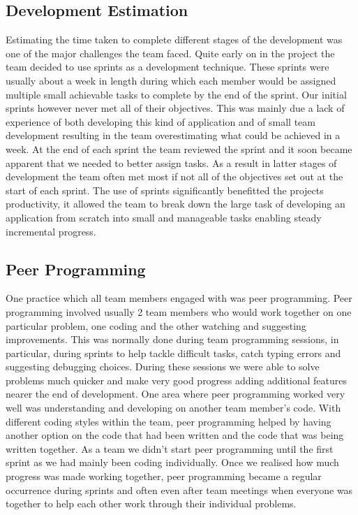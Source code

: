 \documentclass{l3proj}
\begin{document}
\subsection{Development Estimation}
Estimating the time taken to complete different stages of the development was one of the major challenges the team faced. Quite early on in the project the team decided to use sprints as a development technique. These sprints were usually about a week in length during which each member would be assigned multiple small achievable tasks to complete by the end of the sprint. Our initial sprints however never met all of  their objectives. This was mainly due a lack of experience of  both developing this kind of application and of small team development resulting in the team overestimating what could be achieved in a week. At the end of each sprint the team reviewed the sprint and it soon became apparent that we needed to better assign tasks. As a result in latter stages of development the team often met most if not all of  the objectives set out at the start of each sprint. The use of sprints significantly benefitted the projects productivity, it allowed the team to break down the large task of developing an application from scratch into small and manageable tasks enabling steady incremental progress.

\subsection{Peer Programming}
One practice which all team members engaged with was peer programming. Peer programming involved usually 2 team members who would work together on one particular problem, one coding and the other watching and suggesting improvements. This was normally done during team programming sessions, in particular, during sprints to help tackle difficult tasks, catch typing errors and suggesting debugging choices. During these sessions we were able to solve problems much quicker and make very good progress adding additional features nearer the end of development. One area where peer programming worked very well was understanding and developing on another team member’s code. With different coding styles within the team, peer programming helped by having another option on the code that had been written and the code that was being written together. 
As a team we didn’t start peer programming until the first sprint as we had mainly been coding individually. Once we realised how much progress was made working together, peer programming became a regular occurrence during sprints and often even after team meetings when everyone was together to help each other work through their individual problems.
\end{document}
